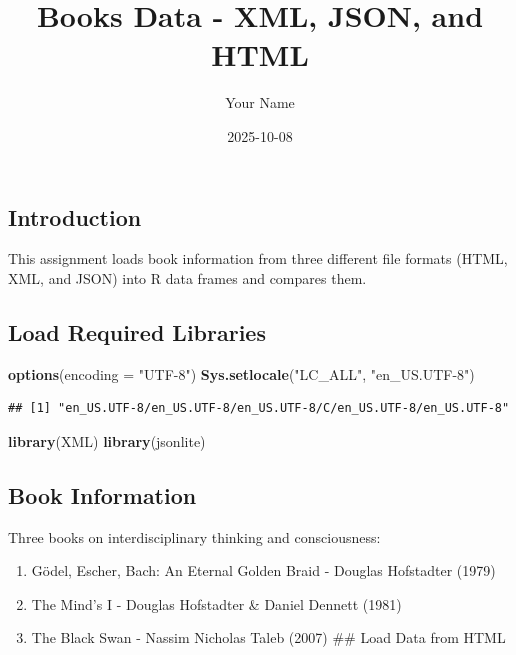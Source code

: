 \documentclass[
]{article}
\title{Books Data - XML, JSON, and HTML}
\author{Your Name}
\date{2025-10-08}
\newenvironment{Shaded}{\begin{snugshade}}{\end{snugshade}}
\newcommand{\AttributeTok}[1]{\textcolor[rgb]{0.13,0.29,0.53}{#1}}
\newcommand{\FunctionTok}[1]{\textcolor[rgb]{0.13,0.29,0.53}{\textbf{#1}}}
\newcommand{\NormalTok}[1]{#1}
\newcommand{\StringTok}[1]{\textcolor[rgb]{0.31,0.60,0.02}{#1}}
\providecommand{\tightlist}{%
  \setlength{\itemsep}{0pt}\setlength{\parskip}{0pt}}
\begin{document}
\maketitle

\subsection{Introduction}\label{introduction}

This assignment loads book information from three different file formats
(HTML, XML, and JSON) into R data frames and compares them.

\subsection{Load Required Libraries}\label{load-required-libraries}

\begin{Shaded}
\begin{Highlighting}[]
\FunctionTok{options}\NormalTok{(}\AttributeTok{encoding =} \StringTok{"UTF{-}8"}\NormalTok{)}
\FunctionTok{Sys.setlocale}\NormalTok{(}\StringTok{"LC\_ALL"}\NormalTok{, }\StringTok{"en\_US.UTF{-}8"}\NormalTok{)}
\end{Highlighting}
\end{Shaded}

\begin{verbatim}
## [1] "en_US.UTF-8/en_US.UTF-8/en_US.UTF-8/C/en_US.UTF-8/en_US.UTF-8"
\end{verbatim}

\begin{Shaded}
\begin{Highlighting}[]
\FunctionTok{library}\NormalTok{(XML)}
\FunctionTok{library}\NormalTok{(jsonlite)}
\end{Highlighting}
\end{Shaded}

\subsection{Book Information}\label{book-information}

Three books on interdisciplinary thinking and consciousness:

\begin{enumerate}
\def\labelenumi{\arabic{enumi}.}
\tightlist
\item
  Gödel, Escher, Bach: An Eternal Golden Braid - Douglas Hofstadter
  (1979)
\item
  The Mind's I - Douglas Hofstadter \& Daniel Dennett (1981)
\item
  The Black Swan - Nassim Nicholas Taleb (2007) \#\# Load Data from HTML
\end{enumerate}
\end{document}
